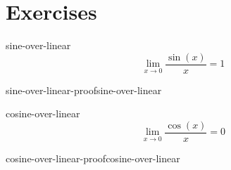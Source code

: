 \documentclass[preview]{standalone}
\begin{document}
\genpage

\section{Exercises}

\begin{snippetproposition}{sine-over-linear}{}
    \[
        \lim_{x \to 0} \frac{\sin(x)}{x} = 1
    \]
\end{snippetproposition}

\begin{snippetproof}{sine-over-linear-proof}{sine-over-linear}{}
    \todo
\end{snippetproof}

\begin{snippetproposition}{cosine-over-linear}{}
    \[
        \lim_{x \to 0} \frac{\cos(x)}{x} = 0
    \]
\end{snippetproposition}


\begin{snippetproof}{cosine-over-linear-proof}{cosine-over-linear}{}
    \todo
\end{snippetproof}
\end{document}
